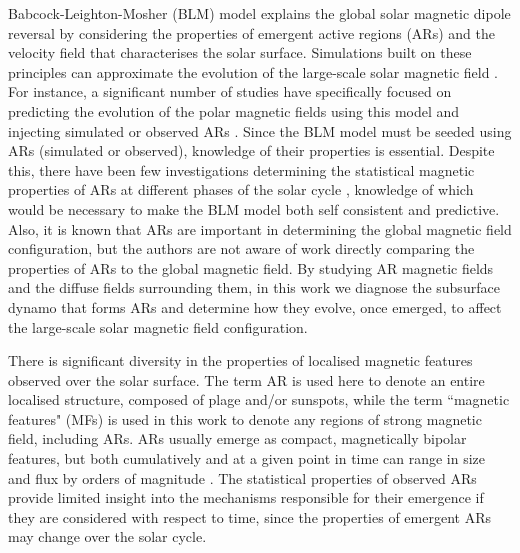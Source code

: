 \documentclass[namedreferences]{solarphysics}
\begin{document}
\begin{article}
Babcock-Leighton-Mosher (BLM) model \citep{Babcock:1961,Leighton:1964,Mosher:1977} explains the global solar magnetic dipole reversal by considering the properties of emergent active regions (ARs) and the velocity field that characterises the solar surface. Simulations built on these principles can approximate the evolution of the large-scale solar magnetic field \citep{Leighton:1964,Sheeley:1985,Devore:1986,Wang:1989}. For instance, a significant number of studies have specifically focused on predicting the evolution of the polar magnetic fields using this model and injecting simulated or observed ARs \citep{Devore:1987,schussler:2006,Wang:2009,Schrijver:2008b,hathaway}. Since the BLM model must be seeded using ARs (simulated or observed), knowledge of their properties is essential. Despite this, there have been few investigations determining the statistical magnetic properties of ARs at different phases of the solar cycle \citep{meunier:2003,zharkov:2006}, knowledge of which would be necessary to make the BLM model both self consistent and predictive. Also, it is known that ARs are important in determining the global magnetic field configuration\citep{wang:2003a, Schrijver:2003, schussler:2006}, but the authors are not aware of work directly comparing the properties of ARs to the global magnetic field. By studying AR magnetic fields and the diffuse fields surrounding them, in this work we diagnose the subsurface dynamo that forms ARs and determine how they evolve, once emerged, to affect the large-scale solar magnetic field configuration. 

There is significant diversity in the properties of localised magnetic features observed over the solar surface. The term AR is used here to denote an entire localised structure, composed of plage and/or sunspots, while the term ``magnetic features" (MFs) is used in this work to denote any regions of strong magnetic field, including ARs. ARs usually emerge as compact, magnetically bipolar features, but both cumulatively \citep{meunier:2003} and at a given point in time can range in size and flux by orders of magnitude \citep{Parnell:2009}. The statistical properties of observed ARs provide limited insight into the mechanisms responsible for their emergence if they are considered with respect to time, since the properties of emergent ARs may change over the solar cycle.


\end{article}
\end{document}
